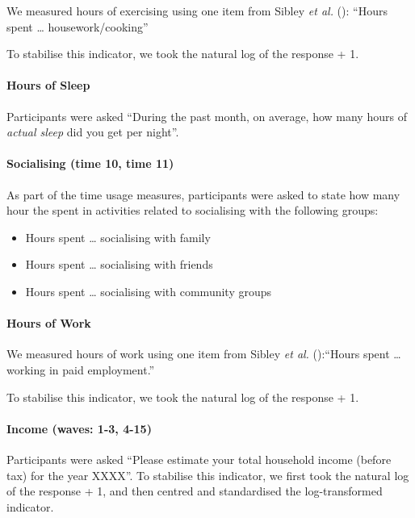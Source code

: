 \documentclass[
  single column]{article}
\let\oldparagraph\paragraph
\renewcommand{\paragraph}[1]{\oldparagraph{#1}\mbox{}}
\providecommand{\tightlist}{%
  \setlength{\itemsep}{0pt}\setlength{\parskip}{0pt}}\usepackage{longtable,booktabs,array}
\begin{document}
We measured hours of exercising using one item from Sibley \emph{et al.}
(): ``Hours spent \ldots{}
housework/cooking''

To stabilise this indicator, we took the natural log of the response +
1.

\paragraph{Hours of Sleep}\label{hours-of-sleep}

Participants were asked ``During the past month, on average, how many
hours of \emph{actual sleep} did you get per night''.

\paragraph{Socialising (time 10, time
11)}\label{socialising-time-10-time-11}

As part of the time usage measures, participants were asked to state how
many hour the spent in activities related to socialising with the
following groups:

\begin{itemize}
\tightlist
\item
  Hours spent \ldots{} socialising with family
\item
  Hours spent \ldots{} socialising with friends
\item
  Hours spent \ldots{} socialising with community groups
\end{itemize}

\paragraph{Hours of Work}\label{hours-of-work}

We measured hours of work using one item from Sibley \emph{et al.}
():``Hours spent \ldots{} working in paid
employment.''

To stabilise this indicator, we took the natural log of the response +
1.

\paragraph{Income (waves: 1-3, 4-15)}\label{income-waves-1-3-4-15}

Participants were asked ``Please estimate your total household income
(before tax) for the year XXXX''. To stabilise this indicator, we first
took the natural log of the response + 1, and then centred and
standardised the log-transformed indicator.
\end{document}

